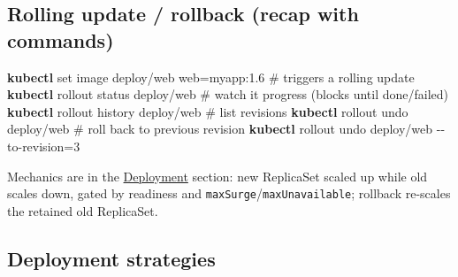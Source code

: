 \documentclass[11pt]{article}
\newenvironment{Shaded}{\begin{snugshade}}{\end{snugshade}}
\newcommand{\AttributeTok}[1]{\textcolor[rgb]{0.16,0.50,0.73}{#1}}
\newcommand{\CommentTok}[1]{\textcolor[rgb]{0.48,0.49,0.49}{#1}}
\newcommand{\ExtensionTok}[1]{\textcolor[rgb]{0.00,0.60,1.00}{\textbf{#1}}}
\newcommand{\NormalTok}[1]{\textcolor[rgb]{0.81,0.81,0.76}{#1}}
\newcommand{\OperatorTok}[1]{\textcolor[rgb]{0.81,0.81,0.76}{#1}}
\begin{document}
\subsection{Rolling update / rollback (recap with commands)}\label{rolling-update--rollback-recap-with-commands}


\begin{Shaded}
\begin{Highlighting}[]
\ExtensionTok{kubectl}\NormalTok{ set image deploy/web web=myapp:1.6   }\CommentTok{\# triggers a rolling update}
\ExtensionTok{kubectl}\NormalTok{ rollout status deploy/web            }\CommentTok{\# watch it progress (blocks until done/failed)}
\ExtensionTok{kubectl}\NormalTok{ rollout history deploy/web           }\CommentTok{\# list revisions}
\ExtensionTok{kubectl}\NormalTok{ rollout undo deploy/web              }\CommentTok{\# roll back to previous revision}
\ExtensionTok{kubectl}\NormalTok{ rollout undo deploy/web }\AttributeTok{{-}{-}to{-}revision}\OperatorTok{=}\NormalTok{3}
\end{Highlighting}
\end{Shaded}

Mechanics are in the \hyperref[kubernetes-workloads]{Deployment} section: new ReplicaSet scaled up while old scales down, gated by readiness and \texttt{maxSurge}/\texttt{maxUnavailable}; rollback re-scales the retained old ReplicaSet.

\subsection{Deployment strategies}\label{deployment-strategies}
\end{document}
